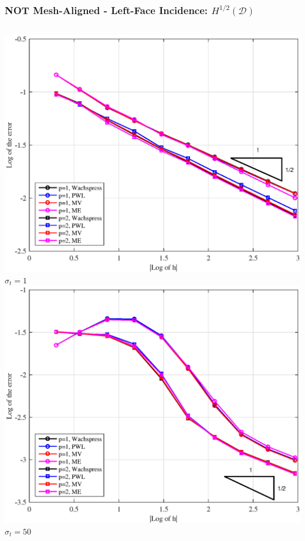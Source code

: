 \documentclass[compress,10pt]{beamer}
\begin{document}
\begin{frame}[t]
{}
{
\frametitle{NOT Mesh-Aligned - Left-Face Incidence: $H^{1/2} (\mathcal{D})$}
\vspace{1.00cm}
\begin{columns}[c]
\centering
{}\includegraphics[width=\textwidth]{images/PAErr_Left_Poly_sig1.eps} \\
$\sigma_t = 1$
\centering
{}\includegraphics[width=\textwidth]{images/PAErr_Left_Poly_sig50.eps} \\
$\sigma_t = 50$
\end{columns}
}
\end{frame}
\end{document}
